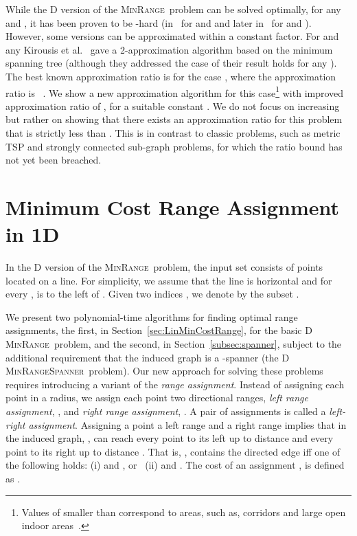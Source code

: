 \documentclass[a4paper]{article}
\newcommand{\MCRA}{\textsc{MinRange}}
\newcommand{\MCRAS}{\textsc{MinRangeSpanner}}
\begin{document}
While the D version of the \MCRA\ problem can be solved optimally,
for any  and , it has been proven to be -hard 
(in~\cite{Kirousis} for  and  and later in~\cite{Clementi} for  and ). 
However, some versions can be approximated within a constant factor. 
For  and any 
Kirousis et al.~\cite{Kirousis} gave a 2-approximation algorithm based on the minimum spanning tree 
(although they addressed the case of  their result holds for any ). 
The best known approximation ratio is for the case , where the approximation ratio is ~\cite{Ambuhl05}.
We show a new approximation algorithm for this case\footnote{Values of  smaller than  correspond to areas, 
such as, corridors and large open indoor areas~\cite{pahlavan2005}.} with improved approximation ratio of , for a suitable constant .
We do not focus on increasing  but rather on showing that there exists an approximation ratio for this problem 
that is strictly less than . This is in contrast to classic problems, such as metric TSP and strongly connected sub-graph problems, 
for which the  ratio bound has not yet been breached.








\section{Minimum Cost Range Assignment in 1D}\label{sec:Linear}
In the D version of the \MCRA\ problem, the input set  consists of points located on a line. 
For simplicity, we assume that the line is horizontal and for every ,  is to the left of .
Given two indices , we denote by  the subset .


We present two polynomial-time algorithms for finding optimal range assignments, 
the first, in Section~\ref{sec:LinMinCostRange}, for the basic D \MCRA \ problem,
and the second, in Section~\ref{subsec:spanner}, subject to the additional requirement 
that the induced graph is a -spanner (the D \MCRAS \ problem).
Our new approach for solving these problems requires introducing a variant of the \emph{range assignment}.
Instead of assigning each point in  a radius,
we assign each point two directional ranges, \emph{left range assignment}, ,
and \emph{right range assignment}, .
A pair of assignments  is called a \emph{left-right assignment}.
Assigning a point  a left range  and a right range 
implies that in the induced graph, ,  can reach every point to its left up to distance 
and every point to its right up to distance .
That is, ,
contains the directed edge  iff one of the following holds:
(i)  and , or \ 
(ii)  and .
The cost of an assignment , is defined as
.
\end{document}
